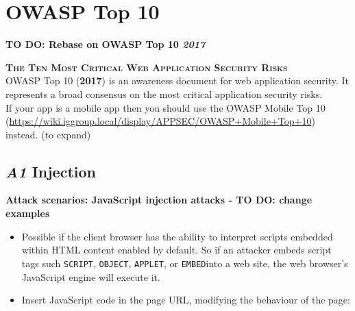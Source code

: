 \documentclass[a5paper,pagesize,10pt,bibtotoc,DIV=10,twoside]{scrbook}
\begin{document}
\section{OWASP Top 10}

\textbf{TO DO: Rebase on OWASP Top 10 \textit{2017}} 

\textsc{\normalsize\textbf{The Ten Most Critical Web Application Security Risks}}\\

OWASP Top 10 (\textbf{2017}) is an awareness document for web application security. It represents a broad consensus on the most critical application security risks. \\

If your app is a mobile app then you should use the OWASP Mobile Top 10 (\url{https://wiki.iggroup.local/display/APPSEC/OWASP+Mobile+Top+10}) instead. (to expand)

\subsection{\textit{A1} \normalsize{Injection}}


\vspace{2mm}
\textbf{Attack scenarios: JavaScript injection attacks - \textbf{TO DO:} change examples}


\begin{itemize}

\item Possible if the client browser has the ability to interpret scripts embedded within HTML content enabled by default. So if an attacker embeds script tags such \big\langle\verb|SCRIPT|\big\rangle, \big\langle\verb|OBJECT|\big\rangle, \big\langle\verb|APPLET|\big\rangle, or \big\langle\verb|EMBED|\big\rangle into a web site, the web browser's JavaScript engine will execute it.

\item Insert JavaScript code in the page URL, modifying the behaviour of the page:

\end{itemize}
\end{document}
